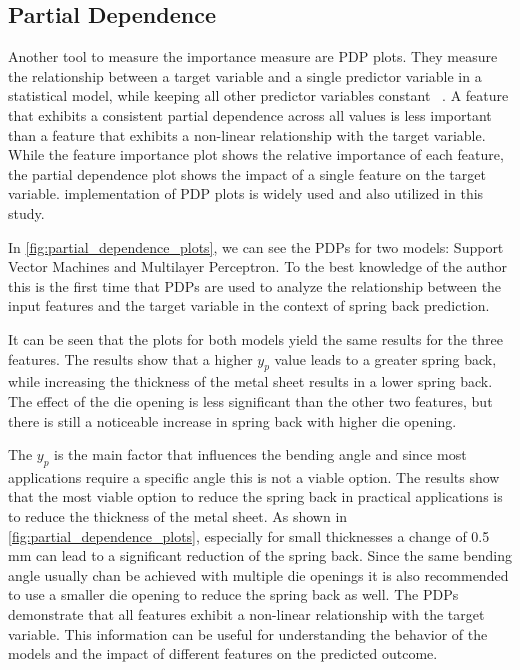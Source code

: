 \subsection{Partial Dependence}
Another tool to measure the importance measure are PDP plots.
They measure the relationship between a target variable and a single predictor variable in a statistical model, while
keeping all other predictor variables constant
~\cite[pp. 313--314]{boehmke2019hands}.
A feature that exhibits a consistent partial dependence across all values is less important than a feature that
exhibits a non-linear relationship with the target variable.
While the feature importance plot shows the relative importance of each feature, the partial dependence plot shows
the impact of a single feature on the target variable.
\cite{scikit-learn} implementation of PDP plots is widely used and also utilized in this study.


In \cref{fig:partial_dependence_plots}, we can see the PDPs for two models: Support Vector Machines and
Multilayer Perceptron.
To the best knowledge of the author this is the first time that PDPs are used to analyze the relationship between
the input features and the target variable in the context of spring back prediction.

It can be seen that the plots for both models yield the same results for the three features.
The results show that a higher $y_p$ value leads to a greater spring back, while
increasing the thickness of the metal sheet results in a lower spring back.
The effect of the die opening is less significant than the other two features, but there is still a noticeable
increase in spring back with higher die opening.

The $y_p$ is the main factor that influences the bending angle and since most applications require a specific angle
this is not a viable option.
The results show that the most viable option to reduce the spring back in practical applications is to reduce the
thickness of the metal sheet.
As shown in \cref{fig:partial_dependence_plots}, especially for small thicknesses a change of 0.5 mm can lead to a
significant reduction of the spring back.
Since the same bending angle usually chan be achieved with multiple die openings it is also recommended to use a
smaller die opening to reduce the spring back as well.
The PDPs demonstrate that all features exhibit a non-linear relationship with the target variable.
This information can be useful for understanding the behavior of the models and the impact of different features on
the predicted outcome.


